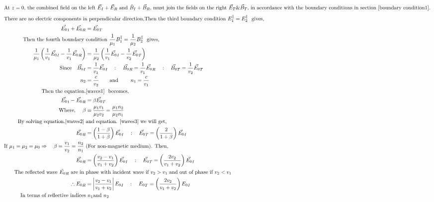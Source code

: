 \begin{align}
\intertext{At $z=0$, the combined field on the left $\vec{E}_{I}+\vec{E}_{R}$ and $\tilde{B}_{I}+\vec{B}_{R}$, must join the fields on the
	right $\vec{E}_{T} \& \vec{B}_{T}$, in accordance with the boundary conditions in section \ref{boundary condition1}.}
\intertext{There are no electric components in perpendicular direction,Then the third boundary condition $E^\parallel_1= E^\parallel_2$ \ gives,}
\vec{E_0}_1+\vec{E_0}_R&=\vec{E_0}_T \label{waves2}\\
\text{Then the fourth boundary }&\text{condition $ \frac{1}{\mu_{1}}B^\parallel_1=  \frac{1}{\mu_{2}}B^\parallel_2$ \ gives,}\\
\frac{1}{\mu_{1}}\left( \frac{1}{v_1}\vec{E_0}_I-\frac{1}{v_1}\vec{E_0}_R\right) &=\frac{1}{\mu_{2}}\left( \frac{1}{v_1}\vec{E_0}_I-\frac{1}{v_2}\vec{E_0}_T\right)\label{waves1}\\
\notag \text{Since}\quad\vec{B_0}_I&=\frac{1}{v_1}\vec{E_0}_I\quad :\quad
\vec{B_0}_R=\frac{1}{v_1}\vec{E_0}_R\quad :\quad
\vec{B_0}_T=\frac{1}{v_2}\vec{E_0}_T\\\notag
n_2&=\frac{c}{v_2}\qquad \text{and }\qquad
n_1=\frac{c}{v_1}\\
\text{Then the equation.}&\text{\ref{waves1} \ becomes,}\\
\vec{E_0}_1-\vec{E_0}_R&=\beta\vec{E_0}_T \label{waves3}\\
\notag \text{Where, }\quad \beta&\equiv\frac{\mu_{1}v_1}{\mu_{2}v_2}=\frac{\mu_{1}n_2}{\mu_{2}n_1}\\
\text{By solving equation.\ref{waves2} }&\text{and equation. \ref{waves3} we will get,}\notag\\
\vec{E_0}_R&=\left( \frac{1-\beta}{1+\beta}\right) \vec{E_0}_I \quad:\quad
\vec{E_0}_T=\left( \frac{2}{1+\beta}\right) \vec{E_0}_I\\
\text{If $\mu_{1}=\mu_{2}=\mu_{0} \Rightarrow \quad \beta=\frac{v_{1}}{v_{2}}=\frac{n_{2}}{n_{1}}$ }&\text{(For non-magnetic medium). Then,}\\
\vec{E_0}_R&=\left( \frac{v_2-v_1}{v_1+v_2}\right) \vec{E_0}_I \quad:\quad
\vec{E_0}_T=\left( \frac{2v_2}{v_1+v_2}\right) \vec{E_0}_I\\
\text{The reflected wave $\tilde{E_0}_R$ are in }&\text{phase with incident wave if $v_2>v_1$ and out of phase if $v_2<v_1$}\\
\therefore {E_0}_R&=\left| \frac{v_2-v_1}{v_1+v_2}\right| {E_0}_I\quad:\quad {E_0}_T=\left(\frac{2v_2}{v_1+v_2} \right) {E_0}_I\\
\text{In terms of reflective indices}&\text{ $n_1$and $n_2$}\\

\end{align}
